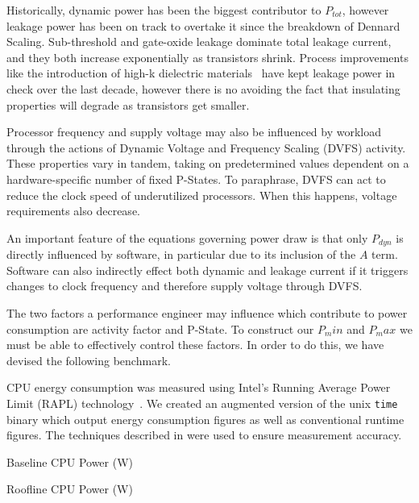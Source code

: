 Historically, dynamic power has been the biggest contributor to $P_{tot}$, however leakage power has been on track to overtake it since the breakdown of Dennard Scaling.  Sub-threshold and gate-oxide leakage dominate total leakage current, and they both increase exponentially as transistors shrink. Process improvements like the introduction of high-k dielectric materials~\cite{jan:2009aa} have kept leakage power in check over the last decade, however there is no avoiding the fact that insulating properties will degrade as transistors get smaller.

Processor frequency and supply voltage may also be influenced by workload through the actions of Dynamic Voltage and Frequency Scaling (DVFS) activity.
These properties vary in tandem, taking on predetermined values dependent on a hardware-specific number of fixed P-States.
To paraphrase, DVFS can act to reduce the clock speed of underutilized processors. When this happens, voltage requirements also decrease.

An important feature of the equations governing power draw is that only $P_{dyn}$ is directly influenced by software, in particular due to its inclusion of the $A$ term. Software can also indirectly effect both dynamic and leakage current if it triggers changes to clock frequency and therefore supply voltage through DVFS.  

The two factors a performance engineer may influence which contribute to power consumption are activity factor and P-State.
To construct our $P_min$ and $P_max$ we must be able to effectively control these factors.
In order to do this, we have devised the following benchmark.

CPU energy consumption was measured using Intel's Running Average Power Limit (RAPL) technology~\cite{david:2010aa}. 
We created an augmented version of the unix \texttt{time} binary which output energy consumption figures as well as conventional runtime figures.
The techniques described in \cite{hackenberg:2013aa} were used to ensure measurement accuracy. 



\begin{table}
\centering

\caption{Baseline CPU Power (W)}
\end{table} 


\begin{table}
\centering

\caption{Roofline CPU Power (W)}
\end{table} 

